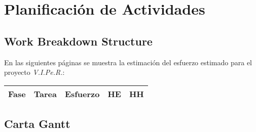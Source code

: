 \appendix
\chapter{Planificaci\'on de Actividades}
\newpage
\section[WBS]{Work Breakdown Structure}
En las siguientes p\'aginas se muestra la estimaci\'on del esfuerzo estimado para el proyecto \emph{V.I.Pe.R.}:

\begin{table}[H]
  \centering
  \begin{tabular}{|l|m{5cm}|l|l|l|}\hline
    {\bf Fase} & {\bf Tarea} & {\bf Esfuerzo} & {\bf HE} & {\bf HH}\\\hline
  \end{tabular}
\end{table}
\newpage
\section{Carta Gantt}

